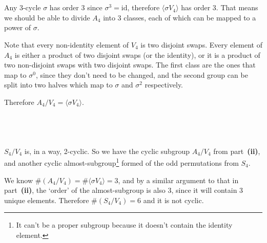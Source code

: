 \documentclass[a4paper]{article}
\begin{document}
\subsection{~} %

Any 3-cycle $\sigma$ has order 3 since $\sigma^3 = \mathrm{id}$, therefore $\langle \sigma V_4 \rangle$ has order 3. That means we should be able to divide $A_4$ into 3 classes, each of which can be mapped to a power of $\sigma$.

Note that every non-identity element of $V_4$ is two disjoint swaps. Every element of $A_4$ is either a product of two disjoint swaps (or the identity), or it is a product of two non-disjoint swaps with two disjoint swaps. The first class are the ones that map to $\sigma^0$, since they don't need to be changed, and the second group can be split into two halves which map to $\sigma$ and $\sigma^2$ respectively.

Therefore $A_4 / V_4 = \langle \sigma V_4 \rangle$.

\newpage
\subsection{~} %

$S_4 / V_4$ is, in a way, 2-cyclic. So we have the cyclic subgroup $A_4 / V_4$ from part~\textbf{(ii)}, and another cyclic almost-subgroup\footnote{It can't be a proper subgroup because it doesn't contain the identity element.} formed of the odd permutations from $S_4$.

We know $\# (A_4 / V_4) = \# \langle \sigma V_4 \rangle = 3$, and by a similar argument to that in part~\textbf{(ii)}, the `order' of the almost-subgroup is also 3, since it will contain 3 unique elements. Therefore $\# (S_4 / V_4) = 6$ and it is not cyclic.

\end{document}
